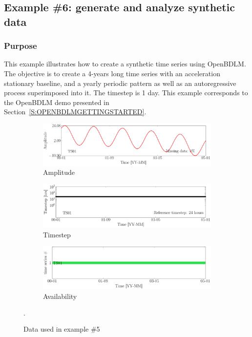 \subsection{Example \#6: generate and analyze synthetic data }
\label{S:EXAMPLESYNTHETICDATA}


\subsubsection{Purpose}
This example illustrates how to create a synthetic time series using OpenBDLM.
The objective is to create a 4-years long time series with an acceleration stationary baseline, and a yearly periodic pattern as well as an autoregressive process superimposed into it. 
The timestep is 1 day.
This example corresponds to the OpenBDLM demo presented in Section~\ref{S:OPENBDLMGETTINGSTARTED}.

\begin{figure}[h!]
\centering
\begin{subfigure}{\linewidth}\centering
\includegraphics[width=0.9\linewidth]{./docfigs/Example_SYNTHETIC/raw/ALL_AMPLITUDES.pdf} 
\caption{Amplitude}
\end{subfigure}
\begin{subfigure}{\linewidth}\centering
\includegraphics[width=0.9\linewidth]{./docfigs/Example_SYNTHETIC/raw/ALL_TIMESTEPS.pdf}
\caption{Timestep}
\end{subfigure}
\begin{subfigure}{\linewidth}\centering
\includegraphics[width=0.9\linewidth]{./docfigs/Example_SYNTHETIC/raw/AVAILABILITY.pdf}
\caption{Availability}
\end{subfigure}
\caption{Data used in example \#5}.
\label{fig:DataSummaryRawSynthetic}
\end{figure}


